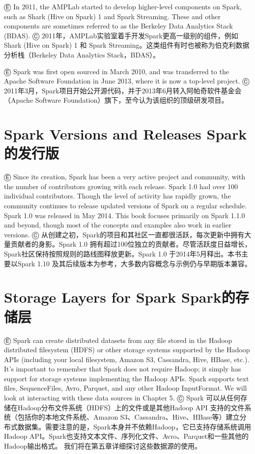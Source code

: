 Ⓔ In 2011, the AMPLab started to develop higher-level components on
Spark, such as Shark (Hive on Spark) 1 and Spark Streaming. These and
other components are sometimes referred to as the Berkeley Data
Analytics Stack (BDAS). Ⓒ
2011年，AMPLab实验室着手开发Spark更高一级别的组件，例如 Shark (Hive on
Spark) 1 和 Spark
Streaming。这类组件有时也被称为伯克利数据分析栈（Berkeley Data Analytics
Stack，BDAS）。

Ⓔ Spark was first open sourced in March 2010, and was transferred to the
Apache Software Foundation in June 2013, where it is now a top-level
project. Ⓒ
2011年3月，Spark项目开始公开源代码，并于2013年6月转入阿帕奇软件基金会（Apache
Software Foundation）旗下，至今认为该组织的顶级研发项目。

\section{Spark Versions and Releases \textbar{}\textbar{}
Spark的发行版}\label{spark-versions-and-releases-sparkux7684ux53d1ux884cux7248}

Ⓔ Since its creation, Spark has been a very active project and
community, with the number of contributors growing with each release.
Spark 1.0 had over 100 individual contributors. Though the level of
activity has rapidly grown, the community continues to release updated
versions of Spark on a regular schedule. Spark 1.0 was released in May
2014. This book focuses primarily on Spark 1.1.0 and beyond, though most
of the concepts and examples also work in earlier versions. Ⓒ
从创建之初，Spark的项目和其社区一直都很活跃，每次更新中拥有大量贡献者的身影。Spark
1.0
拥有超过100位独立的贡献者。尽管活跃度日益增长，Spark社区保持按照规则的路线图释放更新。Spark
1.0 于2014年5月释出。本书主要以Spark 1.10
及其后续版本为参考，大多数内容概念与示例仍与早期版本兼容。

\section{Storage Layers for Spark \textbar{}\textbar{}
Spark的存储层}\label{storage-layers-for-spark-sparkux7684ux5b58ux50a8ux5c42}

Ⓔ Spark can create distributed datasets from any file stored in the
Hadoop distributed filesystem (HDFS) or other storage systems supported
by the Hadoop APIs (including your local filesystem, Amazon S3,
Cassandra, Hive, HBase, etc.). It's important to remember that Spark
does not require Hadoop; it simply has support for storage systems
implementing the Hadoop APIs. Spark supports text files, SequenceFiles,
Avro, Parquet, and any other Hadoop InputFormat. We will look at
interacting with these data sources in Chapter 5. Ⓒ Spark
可以从任何存储在Hadoop分布文件系统（HDFS）上的文件或是其他Hadoop API
支持的文件系统（包括你的本地文件系统、Amazon
S3、Cassandra、Hive、HBase等）建立分布式数据集。需要注意的是，Spark本身并不依赖Hadoop，它已支持存储系统调用Hadoop
API。Spark也支持文本文件、序列化文件、Avro、Parquet和一些其他的Hadoop输出格式。
我们将在第五章详细探讨这些数据源的使用。

